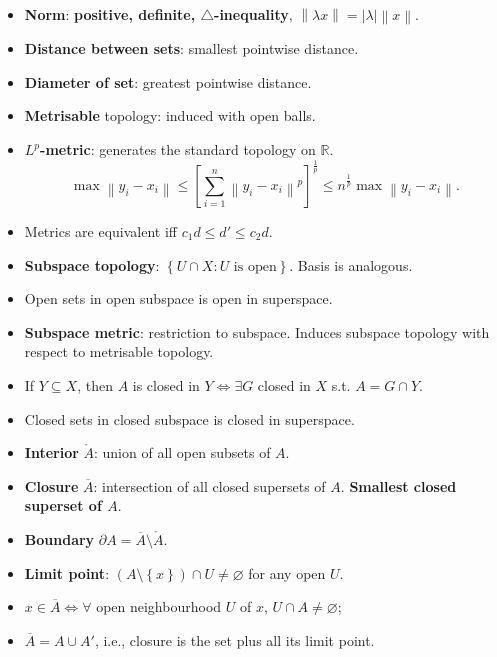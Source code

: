 \documentclass[10pt]{article}
\newcommand{\R}{\mathbb{R}} %
\newcommand{\abs}[1]{\left\lvert#1\right\rvert} %
\newcommand{\norm}[1]{\left\lVert#1\right\rVert} %
\begin{document}
\begin{multicols*}{3}
\begin{itemize}
            \item \textbf{Norm}: \textbf{positive, definite, $\triangle$-inequality}, $\norm{\lambda x} = \abs{\lambda}\norm{x}$.
            \item \textbf{Distance between sets}: smallest pointwise distance.
            \item \textbf{Diameter of set}: greatest pointwise distance.
            \item \textbf{Metrisable} topology: induced with open balls.
            \item $L^p$\textbf{-metric}: generates the standard topology on $\R$.
            \begin{equation*}
                \max\norm{y_i - x_i} \leq \left[\sum_{i = 1}^{n}\norm{y_i - x_i}^p\right]^{\frac{1}{p}} \leq n^{\frac{1}{p}}\max\norm{y_i - x_i}.
            \end{equation*}
            \item Metrics are equivalent iff $c_1d \leq d' \leq c_2d$.
            \item \textbf{Subspace topology}: $\left\{U \cap X \colon U \textrm{ is open}\right\}$. Basis is analogous.
            \item Open sets in open subspace is open in superspace.
            \item \textbf{Subspace metric}: restriction to subspace. Induces subspace topology with respect to metrisable topology.
            \item If $Y \subseteq X$, then $A$ is closed in $Y \iff \exists G$ closed in $X$ s.t. $A = G \cap Y$.
            \item Closed sets in closed subspace is closed in superspace.
            \item \textbf{Interior} $\mathring{A}$: union of all open subsets of $A$.
            \item \textbf{Closure} $\overline{A}$: intersection of all closed supersets of $A$. \textbf{Smallest closed superset of $A$}.
            \item \textbf{Boundary} $\partial A = \overline{A} \setminus \mathring{A}$.
            \item \textbf{Limit point}: $\left(A \setminus \left\{x\right\}\right) \cap U \neq \varnothing$ for any open $U$.
            \item $x \in \overline{A} \iff \forall$ open neighbourhood $U$ of $x$, $U \cap A \neq \varnothing$;
            \item $\overline{A} = A \cup A'$, i.e., closure is the set plus all its limit point.

\end{itemize}
\end{multicols*}
\end{document}
